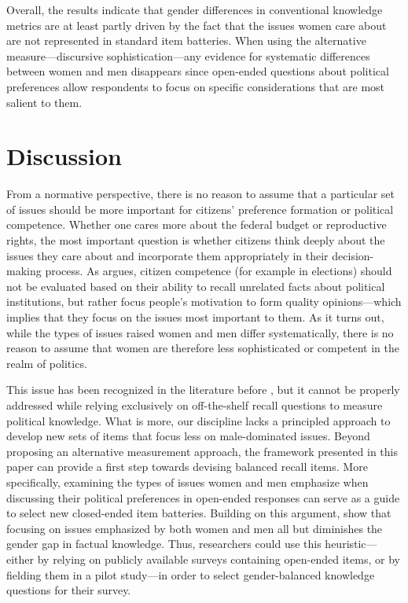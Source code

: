 Overall, the results indicate that gender differences in conventional knowledge metrics are at least partly driven by the fact that the issues women care about are not represented in standard item batteries. When using the alternative measure---discursive sophistication---any evidence for systematic differences between women and men disappears since open-ended questions about political preferences allow respondents to focus on specific considerations that are most salient to them. 



\section*{Discussion}

From a normative perspective, there is no reason to assume that a particular set of issues should be more important for citizens' preference formation or political competence. Whether one cares more about the federal budget or reproductive rights, the most important question is whether citizens think deeply about the issues they care about and incorporate them appropriately in their decision-making process. As \citet{druckman2014pathologies} argues, citizen competence (for example in elections) should not be evaluated based on their ability to recall unrelated facts about political institutions, but rather focus people's motivation to form quality opinions---which implies that they focus on the issues most important to them. As it turns out, while the types of issues raised women and men differ systematically, there is no reason to assume that women are therefore less sophisticated or competent in the realm of politics.

This issue has been recognized in the literature before \citep[e.g.,][]{graber2001processing,dolan2011women,ferrin2020gender}, but it cannot be properly addressed while relying exclusively on off-the-shelf recall questions to measure political knowledge. What is more, our discipline lacks a principled approach to develop new sets of items that focus less on male-dominated issues. Beyond proposing an alternative measurement approach, the framework presented in this paper can provide a first step towards devising balanced recall items. More specifically, examining the types of issues women and men emphasize when discussing their political preferences in open-ended responses can serve as a guide to select new closed-ended item batteries. Building on this argument, \citet{kraft2023asking} show that focusing on issues emphasized by both women and men all but diminishes the gender gap in factual knowledge. Thus, researchers could use this heuristic---either by relying on publicly available surveys containing open-ended items, or by fielding them in a pilot study---in order to select gender-balanced knowledge questions for their survey.

